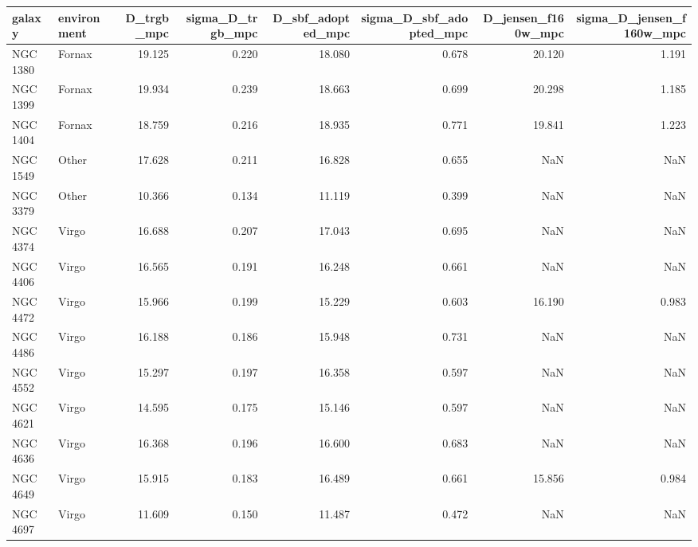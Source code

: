 \begin{tabular}{llrrrrrr}
\toprule
galaxy & environment & D_trgb_mpc & sigma_D_trgb_mpc & D_sbf_adopted_mpc & sigma_D_sbf_adopted_mpc & D_jensen_f160w_mpc & sigma_D_jensen_f160w_mpc \\
\midrule
NGC 1380 & Fornax & 19.125 & 0.220 & 18.080 & 0.678 & 20.120 & 1.191 \\
NGC 1399 & Fornax & 19.934 & 0.239 & 18.663 & 0.699 & 20.298 & 1.185 \\
NGC 1404 & Fornax & 18.759 & 0.216 & 18.935 & 0.771 & 19.841 & 1.223 \\
NGC 1549 & Other & 17.628 & 0.211 & 16.828 & 0.655 & NaN & NaN \\
NGC 3379 & Other & 10.366 & 0.134 & 11.119 & 0.399 & NaN & NaN \\
NGC 4374 & Virgo & 16.688 & 0.207 & 17.043 & 0.695 & NaN & NaN \\
NGC 4406 & Virgo & 16.565 & 0.191 & 16.248 & 0.661 & NaN & NaN \\
NGC 4472 & Virgo & 15.966 & 0.199 & 15.229 & 0.603 & 16.190 & 0.983 \\
NGC 4486 & Virgo & 16.188 & 0.186 & 15.948 & 0.731 & NaN & NaN \\
NGC 4552 & Virgo & 15.297 & 0.197 & 16.358 & 0.597 & NaN & NaN \\
NGC 4621 & Virgo & 14.595 & 0.175 & 15.146 & 0.597 & NaN & NaN \\
NGC 4636 & Virgo & 16.368 & 0.196 & 16.600 & 0.683 & NaN & NaN \\
NGC 4649 & Virgo & 15.915 & 0.183 & 16.489 & 0.661 & 15.856 & 0.984 \\
NGC 4697 & Virgo & 11.609 & 0.150 & 11.487 & 0.472 & NaN & NaN \\
\bottomrule
\end{tabular}
